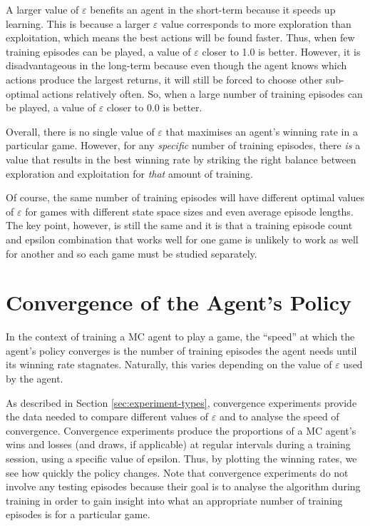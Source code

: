 \documentclass[11pt,a4paper,twoside,openright]{report}
\begin{document}
A larger value of $\varepsilon$ benefits an agent in the short-term because it speeds up learning. This is because a larger $\varepsilon$ value corresponds to more exploration than exploitation, which means the best actions will be found faster. Thus, when few training episodes can be played, a value of $\varepsilon$ closer to 1.0 is better. However, it is disadvantageous in the long-term because even though the agent knows which actions produce the largest returns, it will still be forced to choose other sub-optimal actions relatively often. So, when a large number of training episodes can be played, a value of $\varepsilon$ closer to 0.0 is better.

Overall, there is no single value of $\varepsilon$ that maximises an agent's winning rate in a particular game. However, for any \emph{specific} number of training episodes, there \emph{is} a value that results in the best winning rate by striking the right balance between exploration and exploitation for \emph{that} amount of training.

Of course, the same number of training episodes will have different optimal values of $\varepsilon$ for games with different state space sizes and even average episode lengths. The key point, however, is still the same and it is that a training episode count and epsilon combination that works well for one game is unlikely to work as well for another and so each game must be studied separately.


\section{Convergence of the Agent's Policy}
\label{sec:convergence-results}

In the context of training a MC agent to play a game, the ``speed'' at which the agent's policy converges is the number of training episodes the agent needs until its winning rate stagnates. Naturally, this varies depending on the value of $\varepsilon$ used by the agent.

As described in Section \ref{sec:experiment-types}, convergence experiments provide the data needed to compare different values of $\varepsilon$ and to analyse the speed of convergence. Convergence experiments produce the proportions of a MC agent's wins and losses (and draws, if applicable) at regular intervals during a training session, using a specific value of epsilon. Thus, by plotting the winning rates, we see how quickly the policy changes. Note that convergence experiments do not involve any testing episodes because their goal is to analyse the algorithm during training in order to gain insight into what an appropriate number of training episodes is for a particular game.
\end{document}
